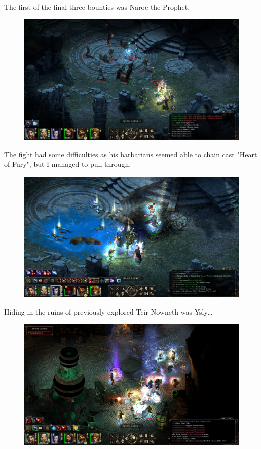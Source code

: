 \documentclass{article}
\begin{document}
The first of the final three bounties was Naroc the Prophet.

\begin{figure}
\includegraphics[scale=0.33]{files/blog/2019_03_04_pillars_of_eternity_path_of_the_damned_act_iii/2019_03_04_naroc1.jpg}
\end{figure}

The fight had some difficulties as his barbarians seemed able to chain cast "Heart of Fury", but I managed to pull through.

\begin{figure}
\includegraphics[scale=0.33]{files/blog/2019_03_04_pillars_of_eternity_path_of_the_damned_act_iii/2019_03_04_naroc2.jpg}
\end{figure}

Hiding in the ruins of previously-explored Teir Nowneth was Ysly\ldots

\begin{figure}
\includegraphics[scale=0.33]{files/blog/2019_03_04_pillars_of_eternity_path_of_the_damned_act_iii/2019_03_04_ysly1.jpg}
\end{figure}
\end{document}

